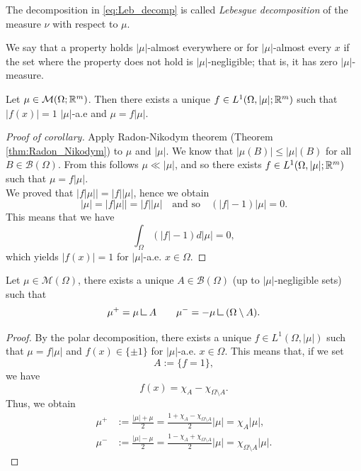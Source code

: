 The decomposition in \eqref{eq:Leb_decomp} is called {\em Lebesgue decomposition} of the measure $\nu$ with respect to $\mu$.

\begin{definition} We say that a property holds $|\mu|$-almost everywhere or for
$|\mu|$-almost every $x$ if the set where the property does not hold is
$|\mu|$-negligible; that is, it has zero $|\mu|$-measure.
\end{definition}

\begin{corollary} \label{cor:polar_decomposition}
Let $\mu \in \mathcal{M}(\Omega;\mathbb{R}^m)$. Then there exists a unique $f \in
L^1(\Omega,|\mu|;\mathbb{R}^m)$ such that $|f(x)| =1 $ $|\mu|$-a.e and $\mu = f|\mu|$.
\end{corollary}

\begin{proof}[Proof of corollary]
Apply Radon-Nikodym theorem (Theorem \ref{thm:Radon_Nikodym}) to $\mu$ and $|\mu|$. We know that 
\(
|\mu(B)| \leq |\mu|(B) 
\)
for all $B \in \mathcal{B}(\Omega)$. From this follows $\mu \ll |\mu|$, and so there exists $f \in L^{1}(\Omega, |\mu|; \mathbb{R}^{m})$ such that $\mu = f|\mu|$.
\\
We proved that $|f|\mu|| = |f||\mu|$, hence we obtain
\[
|\mu| = |f|\mu|| = |f||\mu|
\quad \text{and so} \quad
(|f| - 1)|\mu| = 0.
\]
This means that we have
\[
\int_{\Omega}(|f| - 1)d|\mu| = 0,
\]
which yields $|f(x)| =1$ for $|\mu|$-a.e. $x \in \Omega$. 
\end{proof}

\begin{corollary}
Let $\mu \in \mathcal{M}(\Omega)$, there exists a unique $A \in
\mathcal{B}(\Omega)$ (up to $|\mu|$-negligible sets) such that 
\[
\mu^+ = \mu \res A
\qquad 
\mu^- = -\mu \res (\Omega \setminus A).
\]
\end{corollary}
\begin{proof}
By the polar decomposition, there exists a unique $f \in L^{1}(\Omega, |\mu|)$ such that $\mu = f|\mu|$ and $f(x) \in \{\pm 1\}$ for
$|\mu|$-a.e. $x\in\Omega$. This means that, if we set
$$A:= \{f =1 \},$$
we have
\begin{equation*}
f(x) = \chi_A - \chi_{\Omega\setminus A}.
\end{equation*}
Thus, we obtain
\begin{align*}
\mu^+ & := \frac{|\mu| + \mu}{2} = \frac{ 1 + \chi_A - \chi_{\Omega\setminus A}}{2} |\mu| = \chi_{A} |\mu|, \\
\mu^- & := \frac{|\mu| - \mu}{2} = \frac{1 - \chi_{A} + \chi_{\Omega \setminus A}}{2} |\mu| = \chi_{\Omega \setminus A} |\mu|.
\end{align*}
\end{proof}

